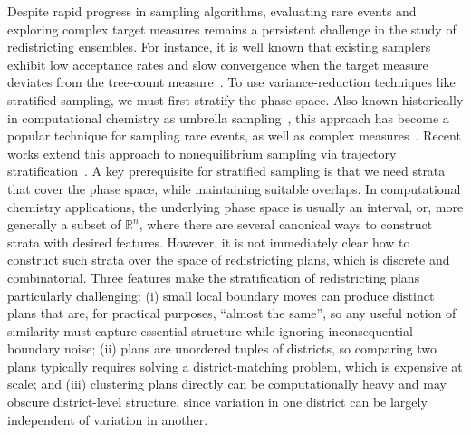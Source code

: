 Despite rapid progress in sampling algorithms, evaluating rare events and exploring complex target measures remains a persistent challenge in the study of redistricting ensembles.
For instance, it is well known that existing samplers exhibit low acceptance rates and slow convergence when the target measure deviates from the tree-count measure~\cite{autry2020multi,cyclewalk}.
To use variance-reduction techniques like stratified sampling, we must first stratify the phase space.
Also known historically in computational chemistry as umbrella sampling~\cite{torrie1977nonphysical}, this approach has become a popular technique for sampling rare events, as well as complex measures~\cite{dinner2020stratification}.
Recent works extend this approach to nonequilibrium sampling via trajectory stratification~\cite{dinner2018trajectory}.
A key prerequisite for stratified sampling is that we need strata that cover the phase space, while maintaining suitable overlaps.
In computational chemistry applications, the underlying phase space is usually an interval, or, more generally a subset of $\mathbb{R}^n$, where there are several canonical ways to construct strata with desired features.
However, it is not immediately clear how to construct such strata over the space of redistricting plans, which is discrete and combinatorial.
Three features make the stratification of redistricting plans particularly challenging: (i) small local boundary moves can produce distinct plans that are, for practical purposes, ``almost the same'', so any useful notion of similarity must capture essential structure while ignoring inconsequential boundary noise; (ii) plans are unordered tuples of districts, so comparing two plans typically requires solving a district-matching problem, which is expensive at scale; and (iii) clustering plans directly can be computationally heavy and may obscure district-level structure, since variation in one district can be largely independent of variation in another.

